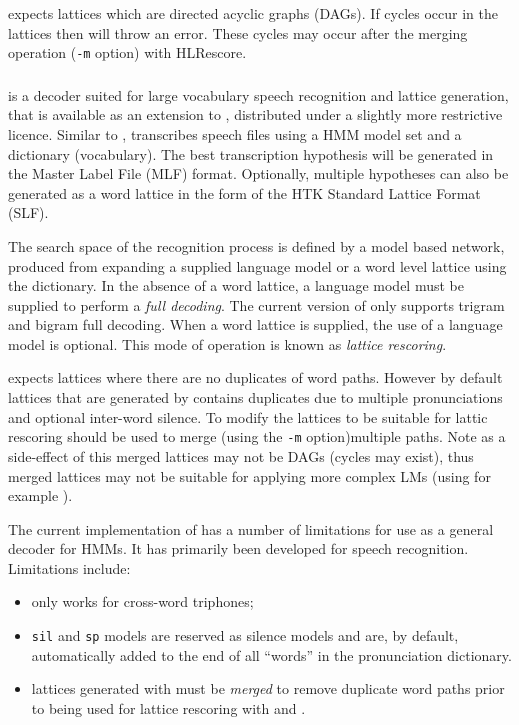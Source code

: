  expects lattices which are directed acyclic graphs
(DAGs).  If cycles occur in the lattices then  will
throw an error.  These cycles may occur after the merging operation
({\tt -m} option) with HLRescore.

\subsubsection{}
 is a decoder suited for large vocabulary speech
recognition and lattice generation, that is available as an extension
to \HTK, distributed under a slightly more restrictive licence.
Similar to ,  transcribes speech files
using a HMM model set and a dictionary (vocabulary). The best
transcription hypothesis will be generated in the Master Label File
(MLF) format. Optionally, multiple hypotheses can also be generated as
a word lattice in the form of the HTK Standard Lattice Format (SLF).

The search space of the recognition process is defined by a model
based network, produced from expanding a supplied language model or a
word level lattice using the dictionary. In the absence of a word
lattice, a language model must be supplied to perform a \emph{full
decoding}.  The current version of  only supports
trigram and bigram full decoding.  When a word lattice is supplied, the use of a
language model is optional.  This mode of operation is known as
\emph{lattice rescoring}.

 expects lattices where there are no duplicates of word
paths. However by default lattices that are generated by
 contains duplicates due to multiple pronunciations
and optional inter-word silence. To modify the lattices to be suitable
for lattic rescoring  should be used to merge (using
the {\tt -m} option)multiple paths. Note as a side-effect of this
merged lattices may not be DAGs (cycles may exist), thus merged lattices
may not be suitable for applying more complex LMs (using for example
).

The current implementation of  has a number of limitations
for use as a general decoder for HMMs. It has primarily been developed for 
speech recognition. Limitations include:
\begin{itemize}
\item only works for cross-word triphones;
\item \texttt{sil} and \texttt{sp} models are reserved as silence
models and are, by default, automatically added to the end of all
``words'' in the pronunciation dictionary.
\item lattices generated with  must be {\em merged}
to remove duplicate word paths prior to being used for lattice rescoring
with  and .
\end{itemize}

